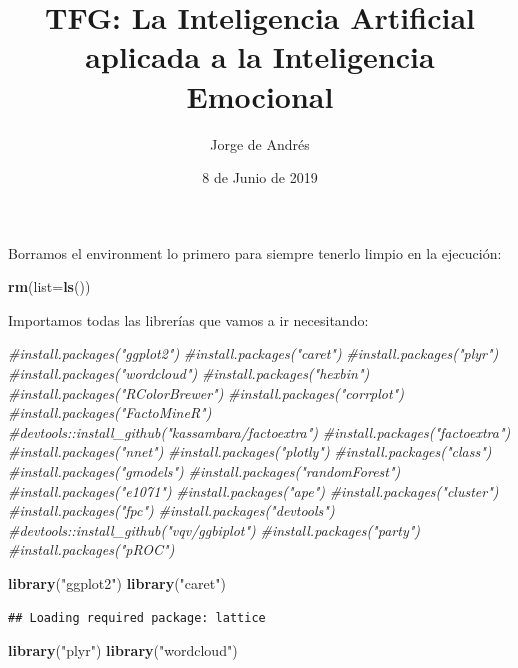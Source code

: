 \documentclass[]{article}
\title{TFG: La Inteligencia Artificial aplicada a la Inteligencia Emocional}
\author{Jorge de Andrés}
\date{8 de Junio de 2019}
\newenvironment{Shaded}{\begin{snugshade}}{\end{snugshade}}
\newcommand{\CommentTok}[1]{\textcolor[rgb]{0.56,0.35,0.01}{\textit{#1}}}
\newcommand{\DataTypeTok}[1]{\textcolor[rgb]{0.13,0.29,0.53}{#1}}
\newcommand{\KeywordTok}[1]{\textcolor[rgb]{0.13,0.29,0.53}{\textbf{#1}}}
\newcommand{\NormalTok}[1]{#1}
\newcommand{\StringTok}[1]{\textcolor[rgb]{0.31,0.60,0.02}{#1}}
\begin{document}
\maketitle

Borramos el environment lo primero para siempre tenerlo limpio en la
ejecución:

\begin{Shaded}
\begin{Highlighting}[]
\KeywordTok{rm}\NormalTok{(}\DataTypeTok{list=}\KeywordTok{ls}\NormalTok{())}
\end{Highlighting}
\end{Shaded}

Importamos todas las librerías que vamos a ir necesitando:

\begin{Shaded}
\begin{Highlighting}[]
\CommentTok{#install.packages("ggplot2")}
\CommentTok{#install.packages("caret")}
\CommentTok{#install.packages("plyr")}
\CommentTok{#install.packages("wordcloud")}
\CommentTok{#install.packages("hexbin")}
\CommentTok{#install.packages("RColorBrewer")}
\CommentTok{#install.packages("corrplot")}
\CommentTok{#install.packages("FactoMineR")}
\CommentTok{#devtools::install_github("kassambara/factoextra")}
\CommentTok{#install.packages("factoextra")}
\CommentTok{#install.packages("nnet")}
\CommentTok{#install.packages("plotly")}
\CommentTok{#install.packages("class")}
\CommentTok{#install.packages("gmodels")}
\CommentTok{#install.packages("randomForest")}
\CommentTok{#install.packages("e1071")}
\CommentTok{#install.packages("ape")}
\CommentTok{#install.packages("cluster")}
\CommentTok{#install.packages("fpc")}
\CommentTok{#install.packages("devtools")}
\CommentTok{#devtools::install_github("vqv/ggbiplot")}
\CommentTok{#install.packages("party")}
\CommentTok{#install.packages("pROC")}

\KeywordTok{library}\NormalTok{(}\StringTok{"ggplot2"}\NormalTok{)}
\KeywordTok{library}\NormalTok{(}\StringTok{"caret"}\NormalTok{)}
\end{Highlighting}
\end{Shaded}

\begin{verbatim}
## Loading required package: lattice
\end{verbatim}

\begin{Shaded}
\begin{Highlighting}[]
\KeywordTok{library}\NormalTok{(}\StringTok{"plyr"}\NormalTok{)}
\KeywordTok{library}\NormalTok{(}\StringTok{"wordcloud"}\NormalTok{)}
\end{Highlighting}
\end{Shaded}
\end{document}
